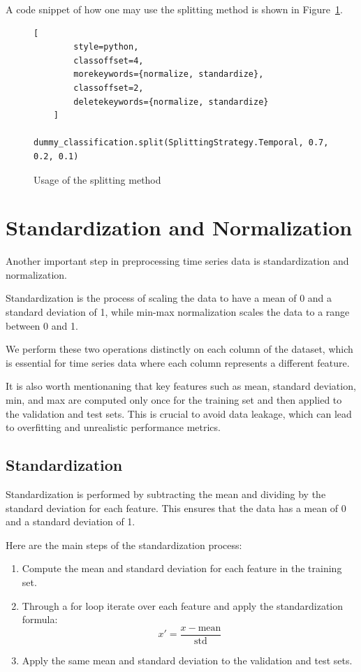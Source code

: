 \documentclass[review]{AIM_report}
\begin{document}
A code snippet of how one may use the splitting method is shown in Figure~\ref{fig:usage_splitting}.

\begin{figure}[H]
    \begin{lstlisting}[
        style=python, 
        classoffset=4, 
        morekeywords={normalize, standardize}, 
        classoffset=2, 
        deletekeywords={normalize, standardize}
    ]

dummy_classification.split(SplittingStrategy.Temporal, 0.7, 0.2, 0.1)
    \end{lstlisting}
    \caption{Usage of the splitting method}
    \label{fig:usage_splitting}
\end{figure}

\newpage
\section{Standardization and Normalization}
Another important step in preprocessing time series data is standardization and normalization. 

Standardization is the process of scaling the data to have a mean of 0 and a standard deviation of 1, while min-max normalization scales the data to a range between 0 and 1.

We perform these two operations distinctly on each column of the dataset, which is essential for time series data where each column represents a different feature.

It is also worth mentionaning that key features such as mean, standard deviation, min, and max are computed only once for the training set and then applied to the validation and test sets. This is crucial to avoid data leakage, which can lead to overfitting and unrealistic performance metrics.

\subsection{Standardization}

Standardization is performed by subtracting the mean and dividing by the standard deviation for each feature. This ensures that the data has a mean of 0 and a standard deviation of 1.

Here are the main steps of the standardization process:
\begin{enumerate}
    \item Compute the mean and standard deviation for each feature in the training set.
    \item Through a for loop iterate over each feature and apply the standardization formula:
    \begin{equation}
        x' = \frac{x - \text{mean}}{\text{std}}
    \end{equation}
    \item Apply the same mean and standard deviation to the validation and test sets.
\end{enumerate}
\end{document}
